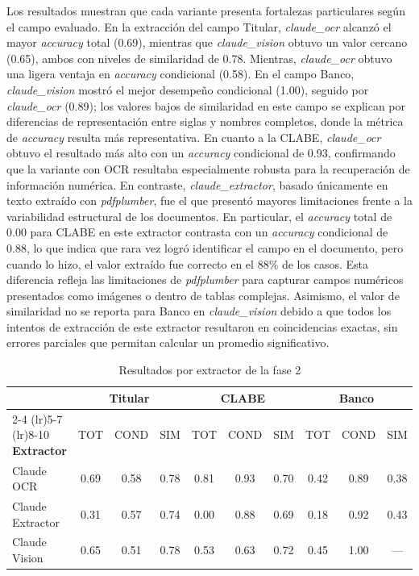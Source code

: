Los resultados muestran que cada variante presenta fortalezas particulares según el campo evaluado. En la extracción del campo Titular, \textit{claude\_ocr} alcanzó el mayor \textit{accuracy} total (0.69), mientras que \textit{claude\_vision} obtuvo un valor cercano (0.65), ambos con niveles de similaridad de 0.78. Mientras, \textit{claude\_ocr} obtuvo una ligera ventaja en \textit{accuracy} condicional (0.58). En el campo Banco, \textit{claude\_vision} mostró el mejor desempeño condicional (1.00), seguido por \textit{claude\_ocr} (0.89); los valores bajos de similaridad en este campo se explican por diferencias de representación entre siglas y nombres completos, donde la métrica de \textit{accuracy} resulta más representativa. En cuanto a la CLABE, \textit{claude\_ocr} obtuvo el resultado más alto con un \textit{accuracy} condicional de 0.93, confirmando que la variante con OCR resultaba especialmente robusta para la recuperación de información numérica. En contraste, \textit{claude\_extractor}, basado únicamente en texto extraído con \textit{pdfplumber}, fue el que presentó mayores limitaciones frente a la variabilidad estructural de los documentos. En particular, el \textit{accuracy} total de 0.00 para CLABE en este extractor contrasta con un \textit{accuracy} condicional de 0.88, lo que indica que rara vez logró identificar el campo en el documento, pero cuando lo hizo, el valor extraído fue correcto en el 88\% de los casos. Esta diferencia refleja las limitaciones de \textit{pdfplumber} para capturar campos numéricos presentados como imágenes o dentro de tablas complejas. Asimismo, el valor de similaridad no se reporta para Banco en \textit{claude\_vision} debido a que todos los intentos de extracción de este extractor resultaron en coincidencias exactas, sin errores parciales que permitan calcular un promedio significativo.



\begin{table}[H]
\centering
\vspace{6pt}
\begin{tabular}{l ccc ccc ccc}
\toprule
 & \multicolumn{3}{c}{\textbf{Titular}} & \multicolumn{3}{c}{\textbf{CLABE}} & \multicolumn{3}{c}{\textbf{Banco}} \\
\cmidrule(lr){2-4} \cmidrule(lr){5-7} \cmidrule(lr){8-10}
\textbf{Extractor} & TOT & COND & SIM & TOT & COND & SIM & TOT & COND & SIM \\
\midrule
Claude OCR       & 0.69 & 0.58 & 0.78 & 0.81 & 0.93 & 0.70 & 0.42 & 0.89 & 0.38 \\
Claude Extractor & 0.31 & 0.57 & 0.74 & 0.00 & 0.88 & 0.69 & 0.18 & 0.92 & 0.43 \\
Claude Vision    & 0.65 & 0.51 & 0.78 & 0.53 & 0.63 & 0.72 & 0.45 & 1.00 & ---  \\
\bottomrule
\end{tabular}
\caption{Resultados por extractor de la fase 2}
\label{tab:resultados-fase2}
\end{table}



